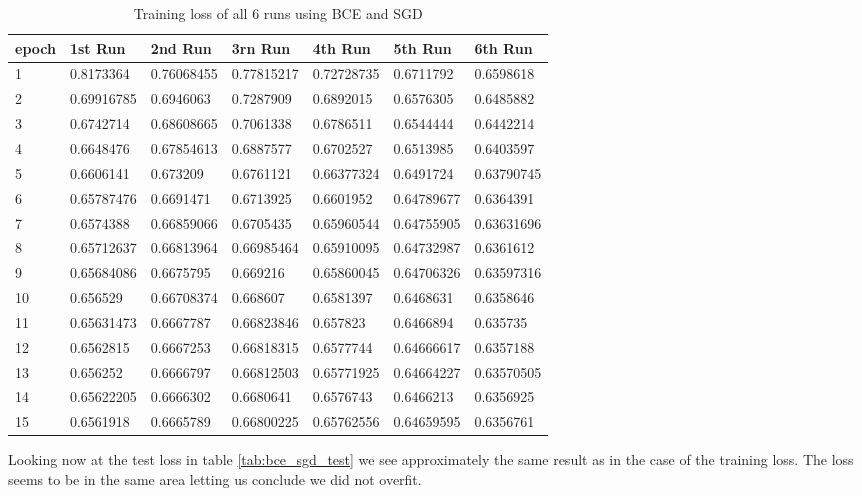 \begin{table}[!ht]
    \centering
    \begin{tabular}{|l||l||l||l||l||l||l|}
    \hline
    epoch & 1st Run & 2nd Run & 3rn Run & 4th Run & 5th Run & 6th Run \\ \hline
        1 & 0.8173364 & 0.76068455 & 0.77815217 & 0.72728735 & 0.6711792 & 0.6598618 \\ \hline
        2 & 0.69916785 & 0.6946063 & 0.7287909 & 0.6892015 & 0.6576305 & 0.6485882 \\ \hline
        3 & 0.6742714 & 0.68608665 & 0.7061338 & 0.6786511 & 0.6544444 & 0.6442214 \\ \hline
        4 & 0.6648476 & 0.67854613 & 0.6887577 & 0.6702527 & 0.6513985 & 0.6403597 \\ \hline
        5 & 0.6606141 & 0.673209 & 0.6761121 & 0.66377324 & 0.6491724 & 0.63790745 \\ \hline
        6 & 0.65787476 & 0.6691471 & 0.6713925 & 0.6601952 & 0.64789677 & 0.6364391 \\ \hline
        7 & 0.6574388 & 0.66859066 & 0.6705435 & 0.65960544 & 0.64755905 & 0.63631696 \\ \hline
        8 & 0.65712637 & 0.66813964 & 0.66985464 & 0.65910095 & 0.64732987 & 0.6361612 \\ \hline
        9 & 0.65684086 & 0.6675795 & 0.669216 & 0.65860045 & 0.64706326 & 0.63597316 \\ \hline
        10 & 0.656529 & 0.66708374 & 0.668607 & 0.6581397 & 0.6468631 & 0.6358646 \\ \hline
        11 & 0.65631473 & 0.6667787 & 0.66823846 & 0.657823 & 0.6466894 & 0.635735 \\ \hline
        12 & 0.6562815 & 0.6667253 & 0.66818315 & 0.6577744 & 0.64666617 & 0.6357188 \\ \hline
        13 & 0.656252 & 0.6666797 & 0.66812503 & 0.65771925 & 0.64664227 & 0.63570505 \\ \hline
        14 & 0.65622205 & 0.6666302 & 0.6680641 & 0.6576743 & 0.6466213 & 0.6356925 \\ \hline
        15 & 0.6561918 & 0.6665789 & 0.66800225 & 0.65762556 & 0.64659595 & 0.6356761 \\ \hline
    \end{tabular}
    \caption{\label{tab:bce_sgd_train}Training loss of all 6 runs using BCE and SGD}
\end{table}

Looking now at the test loss in table \ref{tab:bce_sgd_test} we see approximately the same result as
in the case of the training loss. The loss seems to be in the same area letting us conclude we did not overfit.


